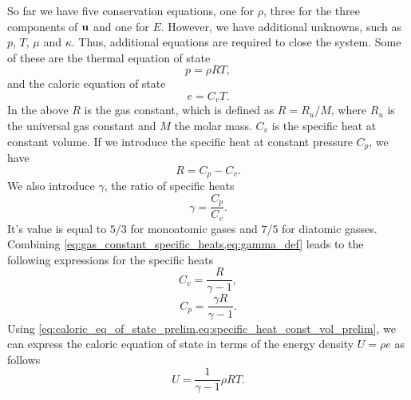 \documentclass[oneside,a4paper,11pt]{report}
\begin{document}
So far we have five conservation equations, one for $\rho$, three for the three components of $\mathbf{u}$ and one for $E$. However, we have additional unknowns, such as $p$, $T$, $\mu$ and $\kappa$. Thus, additional equations are required to close the system. Some of these are the thermal equation of state
\begin{equation}
\label{eq:thermal_eq_of_state_prelim}
    p = \rho R T,
\end{equation}
and the caloric equation of state
\begin{equation}
\label{eq:caloric_eq_of_state_prelim}
    e = C_v T.
\end{equation}
In the above $R$ is the gas constant, which is defined as $R = R_u / M$, where $R_u$ is the universal gas constant and $M$ the molar mass. $C_v$ is the specific heat at constant volume. If we introduce the specific heat at constant pressure $C_p$, we have 
\begin{equation}
\label{eq:gas_constant_specific_heats}
    R = C_p - C_v.
\end{equation}
We also introduce $\gamma$, the ratio of specific heats
\begin{equation}
\label{eq:gamma_def}
    \gamma = \frac{C_p}{C_v}.
\end{equation}
It's value is equal to $5/3$ for monoatomic gases and $7/5$ for diatomic gasses. Combining \cref{eq:gas_constant_specific_heats,eq:gamma_def} leads to the following expressions for the specific heats 
\begin{equation}
\label{eq:specific_heat_const_vol_prelim}
    C_v = \frac{R}{\gamma - 1},
\end{equation}
\begin{equation}
    \label{eq:specific_heat_const_press_prelim}
    C_p = \frac{\gamma R}{\gamma - 1}.
\end{equation}
Using \cref{eq:caloric_eq_of_state_prelim,eq:specific_heat_const_vol_prelim}, we can express the caloric equation of state in terms of the energy density $U = \rho e$ as follows
\begin{equation}
    U = \frac{1}{\gamma - 1} \rho R T.
\end{equation}
\end{document}
